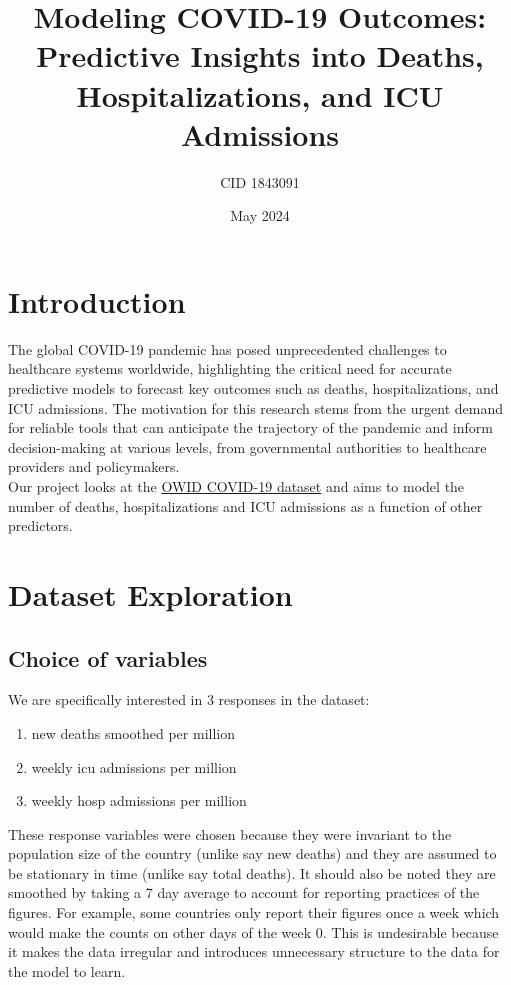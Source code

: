 \documentclass{article}
\title{Modeling COVID-19 Outcomes: Predictive Insights into Deaths, Hospitalizations, and ICU Admissions}
\author{CID 1843091}
\date{May 2024}
\begin{document}
\maketitle

\section{Introduction}

The global COVID-19 pandemic has posed unprecedented challenges to healthcare systems worldwide, highlighting the critical need for accurate predictive models to forecast key outcomes such as deaths, hospitalizations, and ICU admissions. The motivation for this research stems from the urgent demand for reliable tools that can anticipate the trajectory of the pandemic and inform decision-making at various levels, from governmental authorities to healthcare providers and policymakers.\\

Our project looks at the \href{https://github.com/owid/covid-19-data}{OWID COVID-19 dataset} and aims to model the number of deaths, hospitalizations and ICU admissions as a function of other predictors.

\section{Dataset Exploration}

\subsection{Choice of variables}

We are specifically interested in 3 responses in the dataset:

\begin{enumerate}
\item new deaths smoothed per million
\item weekly icu admissions per million
\item weekly hosp admissions per million
\end{enumerate}

These response variables were chosen because they were invariant to the population size of the country (unlike say new deaths) and they are assumed to be stationary in time (unlike say total deaths). It should also be noted they are smoothed by taking a 7 day average to account for reporting practices of the figures. For example, some countries only report their figures once a week which would make the counts on other days of the week 0. This is undesirable because it makes the data irregular and introduces unnecessary structure to the data for the model to learn. \\
\end{document}

